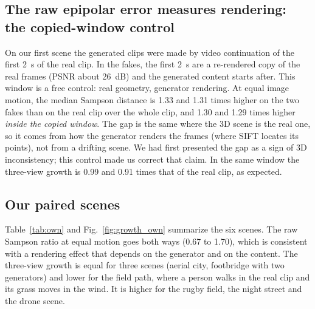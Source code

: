 \documentclass[11pt,a4paper]{article}
\begin{document}
\subsection{The raw epipolar error measures rendering: the copied-window control}

On our first scene the generated clips were made by video continuation of the first 2~s of
the real clip. In the fakes, the first 2~s are a re-rendered copy of the real frames (PSNR
about 26~dB) and the generated content starts after. This window is a free control: real
geometry, generator rendering. At equal image motion, the median Sampson distance is
1.33 and 1.31 times higher on the two fakes than on the real clip over the whole clip, and
1.30 and 1.29 times higher \emph{inside the copied window}. The gap is the same where the
3D scene is the real one, so it comes from how the generator renders the frames (where SIFT
locates its points), not from a drifting scene. We had first presented the gap as a sign of
3D inconsistency; this control made us correct that claim. In the same window the three-view
growth is 0.99 and 0.91 times that of the real clip, as expected.

\subsection{Our paired scenes}

Table~\ref{tab:own} and Fig.~\ref{fig:growth_own} summarize the six scenes. The raw Sampson
ratio at equal motion goes both ways (0.67 to 1.70), which is consistent with a rendering
effect that depends on the generator and on the content. The three-view growth is equal for
three scenes (aerial city, footbridge with two generators) and lower for the field path,
where a person walks in the real clip and its grass moves in the wind. It is higher for the
rugby field, the night street and the drone scene.
\end{document}

